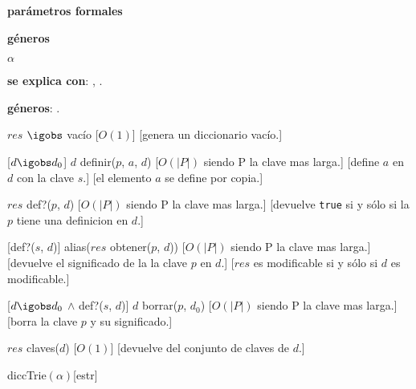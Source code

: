 
\begin{Interfaz}

  \textbf{par\'ametros formales}\parindent\\
  \parbox{1.7cm}{\textbf{g\'eneros}} $\alpha$
 
 
  \textbf{se explica con}: , .

  \textbf{g\'eneros}: .

  {$res$ $\igobs$ vac\'io}
  [$O(1)$]
  [genera un diccionario vac\'io.]

  [$d \igobs d_0$]
  {$d$ \igobs definir($p$, $a$, $d$)}
  [$O(|P|)$ siendo P la clave mas larga.]
  [define $a$ en $d$ con la clave $s$.]
  [el elemento $a$ se define por copia.]

  {$res$ \igobs def?($p$, $d$)}
  [$O(|P|)$ siendo P la clave mas larga.]
  [devuelve \texttt{true} si y s\'olo si la $p$ tiene una definicion en $d$.]

  [def?($s$, $d$)]
  {alias($res$ \igobs obtener($p$, $d$))}
  [$O(|P|)$ siendo P la clave mas larga.]
  [devuelve el significado de la la clave $p$ en $d$.]
  [$res$ es modificable si y s\'olo si $d$ es modificable.]

  [$d \igobs d_0$ $\land$ def?($s$, $d$)]
  {$d$ \igobs borrar($p$, $d_0$)}
  [$O(|P|)$ siendo P la clave mas larga.]
  [borra la clave $p$ y su significado.]

  {$res$ \igobs claves($d$)}
  [$O(1)$]
  [devuelve del conjunto de claves de $d$.]


\end{Interfaz}

\begin{Representacion}
  
  \begin{Estructura}{diccTrie$(\alpha)$}[estr]
    \begin{Tupla}[estr]
    \end{Tupla}

    \begin{Tupla}[nodo]
    \end{Tupla}
  \end{Estructura}




  ~

  \AbsFc[]{}

\end{Representacion}

